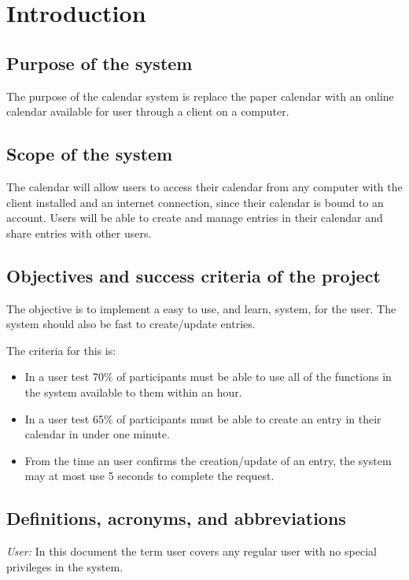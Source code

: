 \section{Introduction}
\subsection{Purpose of the system}
The purpose of the calendar system is replace the paper calendar with an online calendar available for user through a client on a computer. 
\subsection{Scope of the system}
The calendar will allow users to access their calendar from any computer with the client installed and an internet connection, since their calendar is bound to an account. Users will be able to create and manage entries in their calendar and share entries with other users.
\subsection{Objectives and success criteria of the project}
The objective is to implement a easy to use, and learn, system, for the user. The system should also be fast to create/update entries.

The criteria for this is:
\begin{itemize}
\item In a user test 70\% of participants must be able to use all of the functions in the system available to them within an hour.
\item In a user test 65\% of participants must be able to create an entry in their calendar in under one minute.
\item From the time an user confirms the creation/update of an entry, the system may at most use 5 seconds to complete the request.
\end{itemize}
\subsection{Definitions, acronyms, and abbreviations}
\textit{User:} In this document the term user covers any regular user with no special privileges in the system.
